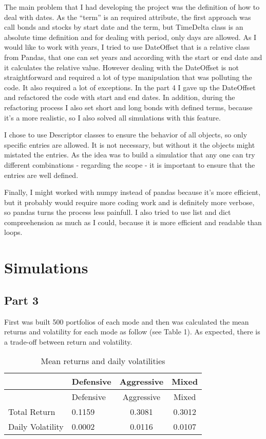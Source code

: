 \documentclass[
  11pt,
]{article}
\begin{document}
The main problem that I had developing the project was the definition of how to deal with dates. As the ``term'' is an required attribute, the first approach was call bonds and stocks by start date and the term, but TimeDelta class is an absolute time definition and for dealing with period, only days are allowed. As I would like to work with years, I tried to use DateOffset that is a relative class from Pandas, that one can set years and according with the start or end date and it calculates the relative value. However dealing with the DateOffset is not straightforward and required a lot of type manipulation that was polluting the code. It also required a lot of exceptions. In the part 4 I gave up the DateOffset and refactored the code with start and end dates. In addition, during the refactoring process I also set short and long bonds with defined terms, because it's a more realistic, so I also solved all simulations with this feature.

I chose to use Descriptor classes to ensure the behavior of all objects, so only specific entries are allowed. It is not necessary, but without it the objects might mistated the entries. As the idea was to build a simulatior that any one can try different combinations - regarding the scope - it is important to ensure that the entries are well defined.

Finally, I might worked with numpy instead of pandas because it's more efficient, but it probably would require more coding work and is definitely more verbose, so pandas turns the process less painfull. I also tried to use list and dict compreehension as much as I could, because it is more efficient and readable than loops.

\hypertarget{simulations}{%
\section{Simulations}\label{simulations}}

\hypertarget{part-3}{%
\subsection{Part 3}\label{part-3}}

First was built 500 portfolios of each mode and then was calculated the mean returns and volatility for each mode as follow (see Table 1). As expected, there is a trade-off between return and volatility.

\begin{longtable}[]{@{}llcc@{}}
\caption{\label{tab:unnamed-chunk-2}Mean returns and daily volatilities}\tabularnewline
\toprule
& Defensive & Aggressive & Mixed\tabularnewline
\midrule
\endfirsthead
\toprule
& Defensive & Aggressive & Mixed\tabularnewline
\midrule
\endhead
Total Return & 0.1159 & 0.3081 & 0.3012\tabularnewline
Daily Volatility & 0.0002 & 0.0116 & 0.0107\tabularnewline
\bottomrule
\end{longtable}
\end{document}
